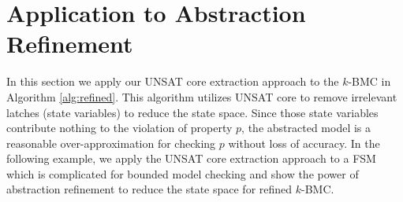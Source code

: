 \section{Application to Abstraction Refinement}
In this section we apply our UNSAT core extraction approach to the 
$k$-BMC in Algorithm \ref{alg:refined}. This algorithm utilizes UNSAT core to 
remove irrelevant latches (state variables) to
reduce the state space. Since those state variables contribute nothing to the violation of 
property $p$, the abstracted model is a reasonable over-approximation for checking 
$p$ without loss of accuracy. In the following example, we apply the UNSAT core extraction 
approach to a FSM which is complicated for bounded model checking and show the power of 
abstraction refinement to reduce the state space for refined $k$-BMC.

